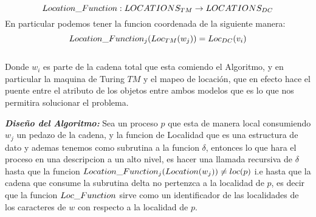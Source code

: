 \documentclass[11pt]{article}
\begin{document}
    \begin{equation}
        Location\char95Function: LOCATIONS_{TM} \rightarrow LOCATIONS_{DC}
    \end{equation}
    \space
    En particular podemos tener la funcion coordenada de la siguiente manera:
    \begin{equation}
        Location\char95Function_{j}(Loc_{TM}(w_{j})) = Loc_{DC}(v_{i})
    \end{equation}
    \\
    \newline
    Donde $w_{i}$ es parte de la cadena total que esta comiendo el Algoritmo, y en
    particular la maquina de Turing $TM$ y el mapeo de locación, que en efecto hace
    el puente entre el atributo de los objetos entre ambos modelos que es lo que nos
    permitira solucionar el problema.

    \newpage
    \textbf{\emph{Diseño del Algoritmo:}} Sea un proceso $p$ que esta de manera local consumiendo
    $w_{j}$ un pedazo de la cadena, y la funcion de Localidad que es una estructura de dato y ademas tenemos
    como subrutina a la funcion $\delta$, entonces lo que
    hara el proceso en una descripcion a un alto nivel, es hacer una llamada recursiva de $\delta$
    hasta que la funcion $Location\char95Function_{j}(Location(w_j)) \neq loc(p)$ i.e hasta que la cadena que consume la subrutina
    delta no pertenzca a la localidad de $p$, es decir que la funcion $Loc\char95Function$ sirve como un identificador
    de las localidades de los caracteres de $w$ con respecto a la localidad de $p$.\newline
\end{document}
